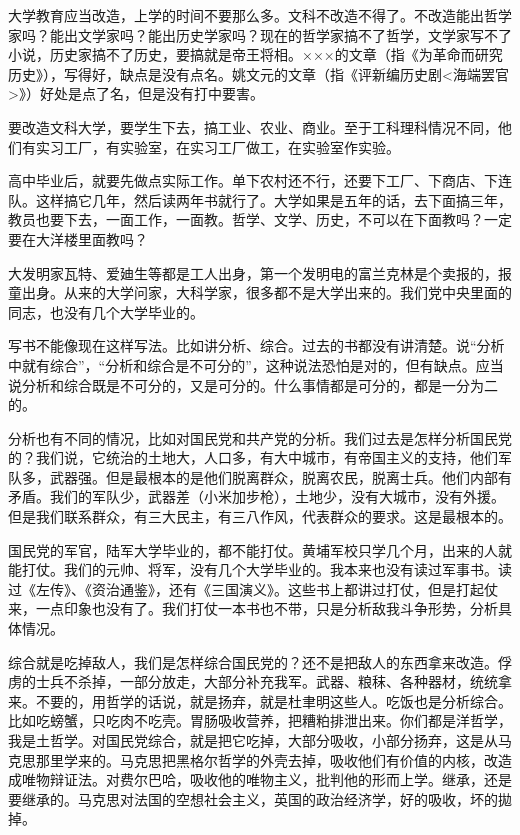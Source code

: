 大学教育应当改造，上学的时间不要那么多。文科不改造不得了。不改造能出哲学家吗？能出文学家吗？能出历史学家吗？现在的哲学家搞不了哲学，文学家写不了小说，历史家搞不了历史，要搞就是帝王将相。×××的文章（指《为革命而研究历史》），写得好，缺点是没有点名。姚文元的文章（指《评新编历史剧<海端罢官>》）好处是点了名，但是没有打中要害。

要改造文科大学，要学生下去，搞工业、农业、商业。至于工科理科情况不同，他们有实习工厂，有实验室，在实习工厂做工，在实验室作实验。

高中毕业后，就要先做点实际工作。单下农村还不行，还要下工厂、下商店、下连队。这样搞它几年，然后读两年书就行了。大学如果是五年的话，去下面搞三年，教员也要下去，一面工作，一面教。哲学、文学、历史，不可以在下面教吗？一定要在大洋楼里面教吗？

大发明家瓦特、爱廸生等都是工人出身，第一个发明电的富兰克林是个卖报的，报童出身。从来的大学问家，大科学家，很多都不是大学出来的。我们党中央里面的同志，也没有几个大学毕业的。

写书不能像现在这样写法。比如讲分析、综合。过去的书都没有讲清楚。说“分析中就有综合”，“分析和综合是不可分的”，这种说法恐怕是对的，但有缺点。应当说分析和综合既是不可分的，又是可分的。什么事情都是可分的，都是一分为二的。

分析也有不同的情况，比如对国民党和共产党的分析。我们过去是怎样分析国民党的？我们说，它统治的土地大，人口多，有大中城市，有帝国主义的支持，他们军队多，武器强。但是最根本的是他们脱离群众，脱离农民，脱离士兵。他们内部有矛盾。我们的军队少，武器差（小米加步枪），土地少，没有大城市，没有外援。但是我们联系群众，有三大民主，有三八作风，代表群众的要求。这是最根本的。

国民党的军官，陆军大学毕业的，都不能打仗。黄埔军校只学几个月，出来的人就能打仗。我们的元帅、将军，没有几个大学毕业的。我本来也没有读过军事书。读过《左传》、《资治通鉴》，还有《三国演义》。这些书上都讲过打仗，但是打起仗来，一点印象也没有了。我们打仗一本书也不带，只是分析敌我斗争形势，分析具体情况。

综合就是吃掉敌人，我们是怎样综合国民党的？还不是把敌人的东西拿来改造。俘虏的士兵不杀掉，一部分放走，大部分补充我军。武器、粮秣、各种器材，统统拿来。不要的，用哲学的话说，就是扬弃，就是杜聿明这些人。吃饭也是分析综合。比如吃螃蟹，只吃肉不吃壳。胃肠吸收营养，把糟粕排泄出来。你们都是洋哲学，我是土哲学。对国民党综合，就是把它吃掉，大部分吸收，小部分扬弃，这是从马克思那里学来的。马克思把黑格尔哲学的外壳去掉，吸收他们有价值的内核，改造成唯物辩证法。对费尔巴哈，吸收他的唯物主义，批判他的形而上学。继承，还是要继承的。马克思对法国的空想社会主义，英国的政治经济学，好的吸收，坏的拋掉。

